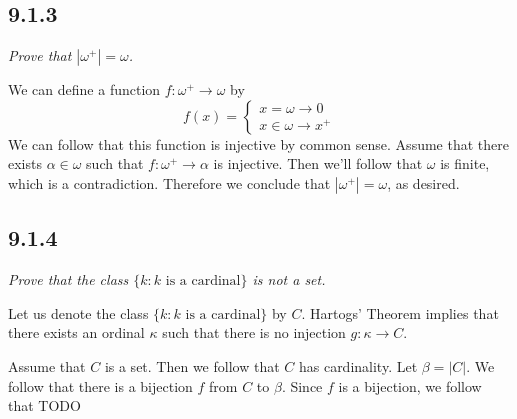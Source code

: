 \documentclass[11pt,oneside,titlepage]{book}
\newcommand{\set}[1]{\{ #1 \}}
\begin{document}
\subsection*{9.1.3}

\textit{Prove that $|\omega^+| = \omega$.}

We can define a function $f: \omega^+ \to \omega$ by
$$f(x) =
\begin{cases}
  x = \omega \to 0 \\
  x \in \omega \to x^+
\end{cases}
$$
We can follow that this function is injective by common sense. Assume that there
exists $\alpha \in \omega$ such that $f: \omega^+ \to \alpha$ is injective. Then we'll
follow that $\omega$ is finite, which is a contradiction. Therefore we conclude that
$|\omega^+| = \omega$, as desired.

\subsection*{9.1.4}

\textit{Prove that the class $\set{k: k \text{ is a cardinal}}$ is not a set.}

Let us denote the class $\set{k: k \text{ is a cardinal}}$ by $C$.
Hartogs' Theorem implies that there exists an ordinal $\kappa$ such that there
is no injection $g: \kappa \to C$. 

Assume that $C$ is a set. Then we follow that $C$ has cardinality. Let $\beta = |C|$.
We follow that there is a bijection $f$ from $C$ to $\beta$.
Since $f$ is a bijection, we follow that TODO
\end{document}
